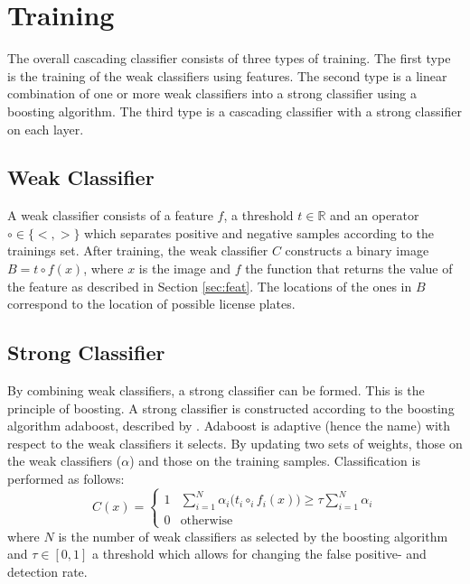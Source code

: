 \documentclass[a4paper,11pt]{article}
\begin{document}
\section{Training} \label{sec:train}
The overall cascading classifier consists of three types of training. The first
type is the training of the weak classifiers using features. The second type is
a linear combination of one or more weak classifiers into a strong classifier
using a boosting algorithm. The third type is a cascading classifier
with a strong classifier on each layer.

\subsection{Weak Classifier} \label{sec:weak}
A weak classifier consists of a feature $f$, a threshold $t \in \mathbb{R}$ and
an operator $\circ \in \{<, >\}$ which separates positive and negative samples
according to the trainings set. After training, the weak classifier $C$
constructs a binary image $B = t \circ f(x)$, where $x$ is the image and $f$
the function that returns the value of the feature as described in Section
\ref{sec:feat}. The locations of the ones in $B$ correspond to the location of
possible license plates.

\subsection{Strong Classifier} \label{sec:strong}
By combining weak classifiers, a strong classifier can be formed. This is the
principle of boosting.  A strong classifier is constructed according to the
boosting algorithm adaboost, described by \cite{viola}. Adaboost is adaptive
(hence the name) with respect to the weak classifiers it selects. By updating
two sets of weights, those on the weak classifiers ($\alpha$) and those on the
training samples. Classification is performed as follows:
\begin{displaymath}
C(x) = 
	\left\{ \begin{array}{ll}
		1 & \sum^N_{i=1} \alpha_i \big(t_i \circ_i f_i(x)\big) \ge \tau \sum^N_{i=1}\alpha_i \\
		0 & \textrm{otherwise}
	\end{array} \right.
\end{displaymath}
where $N$ is the number of weak classifiers as selected by the boosting
algorithm and $\tau \in [0,1]$ a threshold which allows for changing the false
positive- and detection rate.
\end{document}
